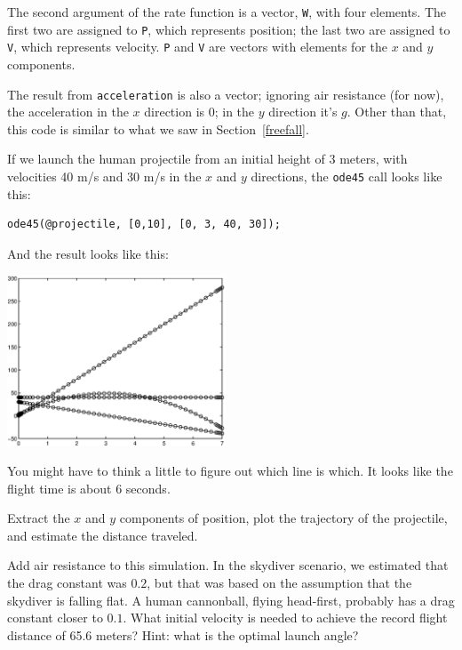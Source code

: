 \documentclass{book}
\begin{document}
The second argument of the rate function is a vector, {\tt W}, with
four elements. The first two are assigned to {\tt P}, which
represents position; the last two are assigned to {\tt V}, which
represents velocity.
{\tt P} and {\tt V} are vectors with
elements for the $x$ and $y$ components.

The result from
{\tt acceleration} is also a vector; ignoring air resistance
(for now), the acceleration in the $x$ direction is 0; in
the $y$ direction it's $g$.
Other than that, this code is similar to what we saw in
Section~\ref{freefall}.

If we launch the human projectile from an initial height of
3 meters, with velocities 40 m/s and 30 m/s in the $x$ and $y$
directions, the {\tt ode45} call looks like
this:

\begin{verbatim}
ode45(@projectile, [0,10], [0, 3, 40, 30]);
\end{verbatim}

And the result looks like this:

\beforefig \centerline{\includegraphics[height=2in]{figs/proj1.eps}}

You might have to think a little to figure out which line is
which. It looks like the flight time is about 6 seconds.

\begin{ex}
Extract the $x$ and $y$ components of
position, plot the trajectory of the projectile, and estimate the
distance traveled.
\end{ex}

\begin{ex}
Add air resistance to this simulation. In
the skydiver scenario, we estimated that the drag constant was
$0.2$, but that was based on the assumption that the skydiver is
falling flat. A human cannonball, flying head-first, probably
has a drag constant closer to $0.1$. What initial velocity
is needed to achieve the record flight distance of 65.6 meters?
Hint: what is the optimal launch angle?
\end{ex}
\end{document}
